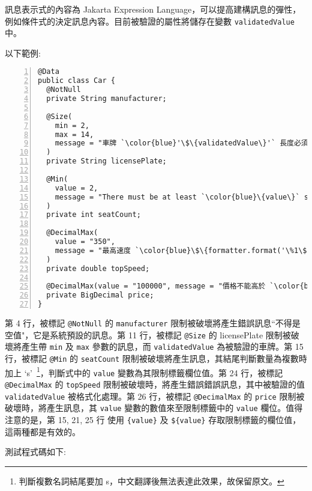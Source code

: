 訊息表示式的內容為 Jakarta Expression Language，可以提高建構訊息的彈性，例如條件式的決定訊息內容。目前被驗證的屬性將儲存在變數 \texttt{validatedValue} 中。

以下範例:

\begin{lstlisting}[numbers=left, xleftmargin=1.5\parindent]
@Data
public class Car {
  @NotNull
  private String manufacturer;

  @Size(
    min = 2,
    max = 14,
    message = "車牌 `\color{blue}'\$\{validatedValue\}'` 長度必須介於 `\color{blue}\{min\}` 與 `\color{blue}\{max\}` 長度之間"
  )
  private String licensePlate;

  @Min(
    value = 2,
    message = "There must be at least `\color{blue}\{value\}` seat`\color{blue}\$\{value > 1 ? 's' : ''\}`"
  )
  private int seatCount;

  @DecimalMax(
    value = "350",
    message = "最高速度 `\color{blue}\$\{formatter.format('\%1\$.2f', validatedValue)\}` 不能超過 `\color{blue}\{value\}`"
  )
  private double topSpeed;

  @DecimalMax(value = "100000", message = "價格不能高於 `\color{blue}\$\{value\}`")
  private BigDecimal price;
}
\end{lstlisting}

第 4 行，被標記 \texttt{@NotNull} 的 \texttt{manufacturer} 限制被破壞將產生錯誤訊息``不得是空值"，它是系統預設的訊息。第 11 行，被標記 \texttt{@Size} 的 licensePlate 限制被破壞將產生帶 \texttt{min} 及 \texttt{max} 參數的訊息，而 \texttt{validatedValue} 為被驗證的車牌。第 15 行，被標記 \texttt{@Min} 的 \texttt{seatCount} 限制被破壞將產生訊息，其結尾判斷數量為複數時加上 `s'~\footnote{判斷複數名詞結尾要加 s，中文翻譯後無法表達此效果，故保留原文。}，判斷式中的 \texttt{value} 變數為其限制標籤欄位值。第 24 行，被標記 \texttt{@DecimalMax} 的 \texttt{topSpeed} 限制被破壞時，將產生錯誤錯誤訊息，其中被驗證的值 \texttt{validatedValue} 被格式化處理。第 26 行，被標記 \texttt{@DecimalMax} 的 \texttt{price} 限制被破壞時，將產生訊息，其 \texttt{value} 變數的數值來至限制標籤中的 \texttt{value} 欄位。值得注意的是，第 15, 21, 25 行 使用 \texttt{\{value\}} 及 \texttt{\$\{value\}} 存取限制標籤的欄位值，這兩種都是有效的。

測試程式碼如下:


